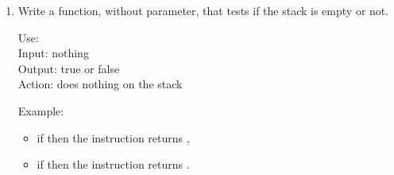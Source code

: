\documentclass[11pt,class=report,crop=false]{standalone}
\begin{document}
\begin{activite}
\begin{enumerate}
  \item Write a  function, without parameter, that tests if the stack is empty or not. 
  
  \begin{fonction}
  Use:  \\
  Input: nothing \\
  Output: true or false \\
  Action: does nothing on the stack
  
  \medskip
    
  Example: 
  \begin{itemize}
    \item if  then the instruction  returns ,
    \item if  then the instruction  returns .
  \end{itemize}
  \end{fonction}
\end{enumerate} 
\end{activite}




\end{document}
